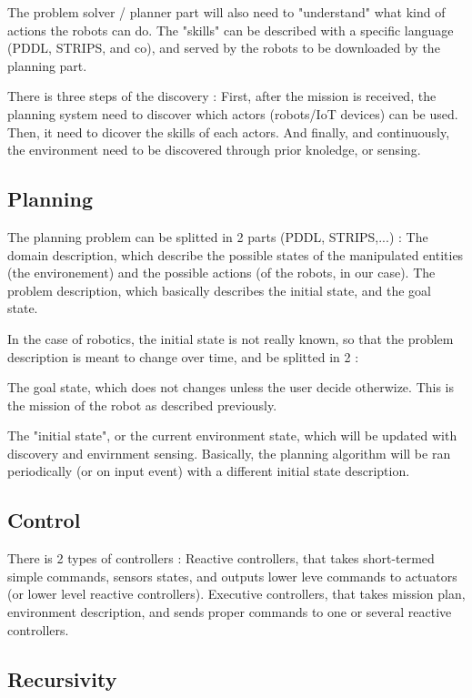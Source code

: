 The problem solver / planner part will also need to "understand" what kind of actions the robots can do.
The "skills" can be described with a specific language (PDDL, STRIPS, and co), and served by the robots to be downloaded by the planning part.

There is three steps of the discovery : 
First, after the mission is received, the planning system need to discover which actors (robots/IoT devices) can be used.
Then, it need to dicover the skills of each actors.
And finally, and continuously, the environment need to be discovered through prior knoledge, or sensing.

\subsection{Planning}

The planning problem can be splitted in 2 parts (PDDL, STRIPS,...) : 
The domain description, which describe the possible states of the manipulated entities (the environement) and the possible actions (of the robots, in our case).
The problem description, which basically describes the initial state, and the goal state.

In the case of robotics, the initial state is not really known, so that the problem description is meant to change over time, and be splitted in 2 : 

The goal state, which does not changes unless the user decide otherwize.
This is the mission of the robot as described previously.

The "initial state", or the current environment state, which will be updated with discovery and envirnment sensing.
Basically, the planning algorithm will be ran periodically (or on input event) with a different initial state description.

\subsection{Control}

There is 2 types of controllers : 
Reactive controllers, that takes short-termed simple commands, sensors states, and outputs lower leve commands to actuators (or lower level reactive controllers).
Executive controllers, that takes mission plan, environment description, and sends proper commands to one or several reactive controllers.

\subsection{Recursivity}

